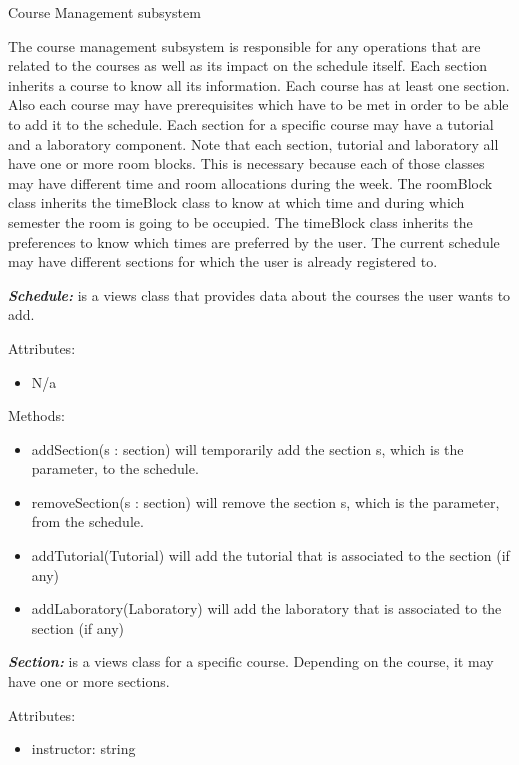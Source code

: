 Course Management subsystem

The course management subsystem is responsible for any operations that
are related to the courses as well as its impact on the schedule itself.
Each section inherits a course to know all its information. Each course
has at least one section. Also each course may have prerequisites which
have to be met in order to be able to add it to the schedule. Each
section for a specific course may have a tutorial and a laboratory
component. Note that each section, tutorial and laboratory all have one
or more room blocks. This is necessary because each of those classes may
have different time and room allocations during the week. The roomBlock
class inherits the timeBlock class to know at which time and during
which semester the room is going to be occupied. The timeBlock class
inherits the preferences to know which times are preferred by the user.
The current schedule may have different sections for which the user is
already registered to.

\textbf{\emph{Schedule:}} is a views class that provides data about the
courses the user wants to add.

Attributes:

\begin{itemize}
\item
  N/a
\end{itemize}

Methods:

\begin{itemize}
\item
  addSection(s : section) will temporarily add the section s, which is
  the parameter, to the schedule.
\item
  removeSection(s : section) will remove the section s, which is the
  parameter, from the schedule.
\item
  addTutorial(Tutorial) will add the tutorial that is associated to the
  section (if any)
\item
  addLaboratory(Laboratory) will add the laboratory that is associated
  to the section (if any)
\end{itemize}

\textbf{\emph{Section:}} is a views class for a specific course.
Depending on the course, it may have one or more sections.

Attributes:

\begin{itemize}
\item
  instructor: string
\end{itemize}

